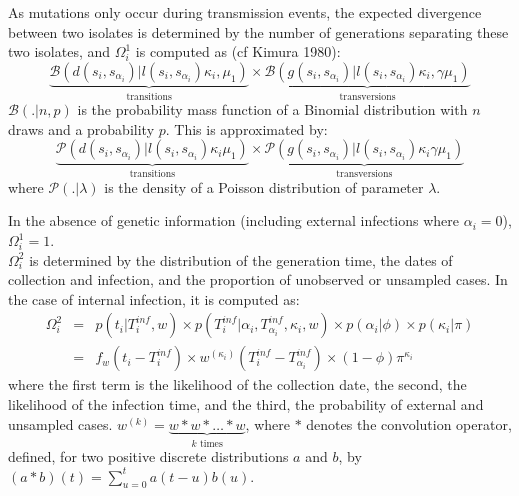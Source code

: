 \documentclass[10pt]{article}
\begin{document}
As mutations only occur during transmission events, the expected divergence between two isolates is determined by the number of generations separating these two isolates, and $\Omega_i^1$ is computed as (cf Kimura 1980): 
\begin{equation}
\underbrace{\mathcal{B}\left(d(s_i,s_{\alpha_i}) | l(s_i,s_{\alpha_i}) \kappa_i, \mu_1 \right)}_{\mbox{transitions}}
\times 
\underbrace{\mathcal{B}\left(g(s_i,s_{\alpha_i}) | l(s_i,s_{\alpha_i}) \kappa_i, \gamma \mu_1 \right)}_{\mbox{transversions}}
\end{equation}
% 
$\mathcal{B}(. | n, p)$ is the probability mass function of a Binomial distribution with $n$ draws and a probability $p$.
This is approximated by:
\begin{equation}
 \underbrace{\mathcal{P}\left(d(s_i,s_{\alpha_i}) | l(s_i,s_{\alpha_i}) \kappa_i \mu_1 \right)}_{\mbox{transitions}}
 \times 
 \underbrace{\mathcal{P}\left(g(s_i,s_{\alpha_i}) | l(s_i,s_{\alpha_i}) \kappa_i \gamma \mu_1 \right)}_{\mbox{transversions}}
 \end{equation}
where $\mathcal{P}(. | \lambda)$ is the density of a Poisson distribution of parameter $\lambda$.

In the absence of genetic information (including external infections where $\alpha_i=0$), $\Omega_i^1 = 1$.
~\\





$\Omega_i^2$ is determined by the distribution of the generation time, the dates of collection and infection, and the proportion of unobserved or unsampled cases.
In the case of internal infection, it is computed as:
\begin{eqnarray}
 \Omega_i^2 & = & p(t_i | T_i^{inf}, w) \times p(T_i^{inf}| \alpha_i, T_{\alpha_i}^{inf}, \kappa_i, w)  
    \times p(\alpha_i | \phi) \times p(\kappa_i | \pi)\nonumber \\
& = &  f_w(t_i - T_i^{inf}) \times  w^{\left(\kappa_i\right)}(T_i^{inf} - T_{\alpha_i}^{inf})
  \times (1 -\phi) \pi^{\kappa_i}
\end{eqnarray}
where the first term is the likelihood of the collection date, the second, the likelihood of the infection time, and the third, the probability of external and unsampled cases.
$w^{\left(k\right)} = \underbrace{w*w*\ldots*w}_{k \text{ times}} $, where $*$ denotes the convolution operator, defined, for two positive discrete distributions $a$ and $b$, by $\left(a*b\right)\left(t\right) = \sum_{u=0}^{t} a\left(t-u\right)b\left(u\right)$. 
\end{document}
